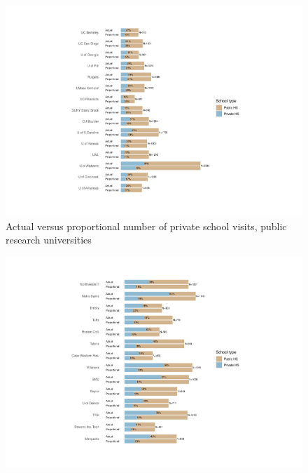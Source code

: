 \documentclass[
]{article}
\begin{document}
\begin{landscape}
\newpage

\begin{figure}

{\centering \includegraphics[width=2\linewidth]{../assets/figures/events_hs_actual_proportional_pubu} 

}

\caption{Actual versus proportional number of private school visits, public research universities}\label{fig:actual-proportional-pubu}
\end{figure}

\clearpage

\begin{figure}

{\centering \includegraphics[width=2\linewidth]{../assets/figures/events_hs_actual_proportional_privu} 

}
\end{figure}
\end{landscape}
\end{document}
